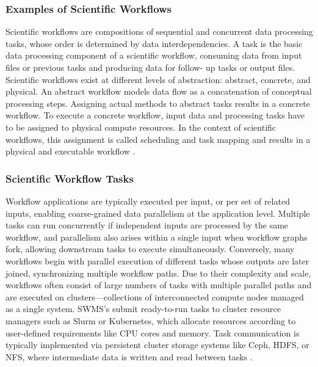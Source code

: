 \subsubsection{Examples of Scientific Workflows}
\label{sec:background_workflows_examples}
Scientific workflows are compositions of sequential and concurrent data processing tasks, whose order is determined by data interdependencies. A task is the basic data processing component of a scientific workflow, consuming data from input files or previous tasks and producing data for follow- up tasks or output files. Scientific workflows exist at different levels of abstraction: abstract, concrete, and physical. An abstract workflow models data flow as a concatenation of conceptual processing steps. Assigning actual methods to abstract tasks results in a concrete workflow. To execute a concrete workflow, input data and processing tasks have to be assigned to physical compute resources. In the context of scientific workflows, this assignment is called scheduling and task mapping and results in a physical and executable workflow \cite{Bux2013}.

\subsubsection{Scientific Workflow Tasks}
\label{sec:background_workflows_examples}
Workflow applications are typically executed per input, or per set of related inputs, enabling coarse-grained data parallelism at the application level. Multiple tasks can run concurrently if independent inputs are processed by the same workflow, and parallelism also arises within a single input when workflow graphs fork, allowing downstream tasks to execute simultaneously. Conversely, many workflows begin with parallel execution of different tasks whose outputs are later joined, synchronizing multiple workflow paths.
Due to their complexity and scale, workflows often consist of large numbers of tasks with multiple parallel paths and are executed on clusters—collections of interconnected compute nodes managed as a single system. SWMS's submit ready-to-run tasks to cluster resource managers such as Slurm or Kubernetes, which allocate resources according to user-defined requirements like CPU cores and memory. Task communication is typically implemented via persistent cluster storage systems like Ceph, HDFS, or NFS, where intermediate data is written and read between tasks \cite{thamsen2025energyawareworkflowexecutionoverview}.

